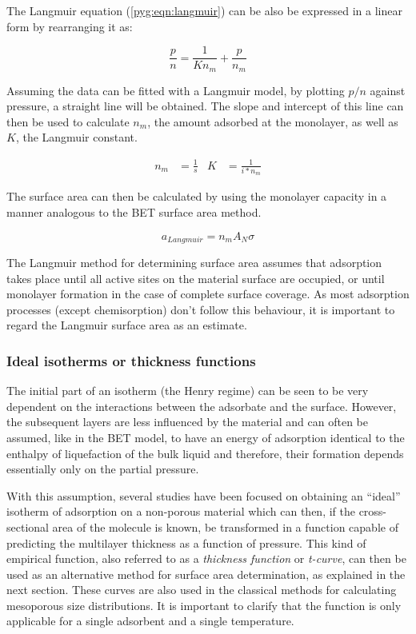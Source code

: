 The Langmuir equation (\autoref{pyg:eqn:langmuir}) can be also
be expressed in a linear form by rearranging it as:

\begin{equation}
	\frac{p}{n} = \frac{1}{K n_m} + \frac{p}{n_m}
\end{equation}

Assuming the data can be fitted with a Langmuir model, by plotting
\({p}/{n}\) against pressure, a straight line will be obtained. The slope and
intercept of this line can then be used to calculate \(n_{m}\),
the amount adsorbed at the monolayer, as well as \(K\), the Langmuir constant.

\begin{align}
	n_m & = \frac{1}{s} & K & = \frac{1}{i * n_m}
\end{align}

The surface area can then be calculated by using the monolayer
capacity in a manner analogous to the BET surface area method.

\begin{equation}
	a_{Langmuir} = n_m A_N \sigma
\end{equation}

The Langmuir method for determining surface area assumes that
adsorption takes place until all active sites on the material
surface are occupied, or until monolayer formation in the
case of complete surface coverage. As most adsorption processes
(except chemisorption) don't follow this behaviour, it is
important to regard the Langmuir surface area as an estimate.

\subsubsection{Ideal isotherms or thickness functions}\label{pyg:charac:tcurve}

The initial part of an isotherm (the Henry regime) can be seen to
be very dependent on the interactions between the adsorbate and the
surface. However, the subsequent layers are less influenced by the
material and can often be assumed, like in the BET model,
to have an energy of adsorption identical to the enthalpy of liquefaction
of the bulk liquid and therefore, their formation depends essentially
only on the partial pressure.

With this assumption, several studies have been focused on obtaining
an ``ideal'' isotherm of adsorption on a non-porous material which can
then, if the cross-sectional area of the molecule is known, be transformed
in a function capable of predicting the multilayer thickness
as a function of pressure. This kind of empirical function,
also referred to as a \textit{thickness function} or \textit{t-curve},
can then be used as an
alternative method for surface area determination, as explained in
the next section. These curves are also used in the classical methods
for calculating mesoporous size distributions. It is important to
clarify that the function is only applicable for a single adsorbent
and a single temperature.


